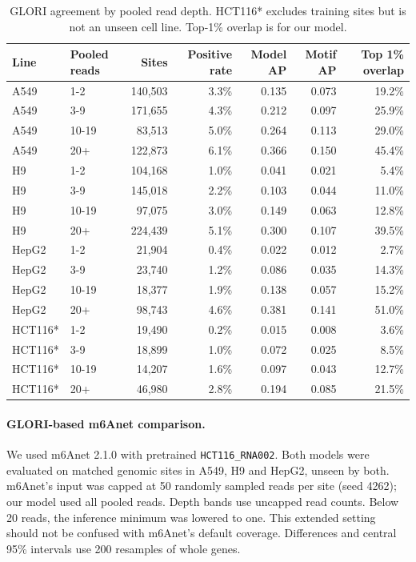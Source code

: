 \documentclass[11pt,a4paper]{article}
\begin{document}
\begin{table}[H]
\centering\footnotesize\setlength{\tabcolsep}{3pt}
\begin{tabular}{llrrrrr}
\toprule
Line & Pooled reads & Sites & Positive rate & Model AP & Motif AP & Top 1\% overlap \\
\midrule
A549 & 1-2 & 140,503 & 3.3\% & 0.135 & 0.073 & 19.2\% \\
A549 & 3-9 & 171,655 & 4.3\% & 0.212 & 0.097 & 25.9\% \\
A549 & 10-19 & 83,513 & 5.0\% & 0.264 & 0.113 & 29.0\% \\
A549 & 20+ & 122,873 & 6.1\% & 0.366 & 0.150 & 45.4\% \\
H9 & 1-2 & 104,168 & 1.0\% & 0.041 & 0.021 & 5.4\% \\
H9 & 3-9 & 145,018 & 2.2\% & 0.103 & 0.044 & 11.0\% \\
H9 & 10-19 & 97,075 & 3.0\% & 0.149 & 0.063 & 12.8\% \\
H9 & 20+ & 224,439 & 5.1\% & 0.300 & 0.107 & 39.5\% \\
HepG2 & 1-2 & 21,904 & 0.4\% & 0.022 & 0.012 & 2.7\% \\
HepG2 & 3-9 & 23,740 & 1.2\% & 0.086 & 0.035 & 14.3\% \\
HepG2 & 10-19 & 18,377 & 1.9\% & 0.138 & 0.057 & 15.2\% \\
HepG2 & 20+ & 98,743 & 4.6\% & 0.381 & 0.141 & 51.0\% \\
HCT116* & 1-2 & 19,490 & 0.2\% & 0.015 & 0.008 & 3.6\% \\
HCT116* & 3-9 & 18,899 & 1.0\% & 0.072 & 0.025 & 8.5\% \\
HCT116* & 10-19 & 14,207 & 1.6\% & 0.097 & 0.043 & 12.7\% \\
HCT116* & 20+ & 46,980 & 2.8\% & 0.194 & 0.085 & 21.5\% \\
\bottomrule
\end{tabular}
\caption{GLORI agreement by pooled read depth. HCT116* excludes training sites but is not an unseen cell line. Top-1\% overlap is for our model.}
\label{tab:glori-depth}
\end{table}

\label{app:glori-comparison}
\paragraph{GLORI-based m6Anet comparison.}
We used m6Anet 2.1.0 with pretrained \texttt{HCT116\_RNA002}. Both models
were evaluated on matched genomic sites in A549, H9 and HepG2, unseen by
both. m6Anet's input was capped at 50 randomly sampled reads per site (seed
4262); our model used all pooled reads. Depth bands use uncapped read counts.
Below 20 reads, the inference minimum was lowered to one. This extended
setting should not be confused with m6Anet's default coverage. Differences
and central 95\% intervals use 200 resamples of whole genes.
\end{document}
